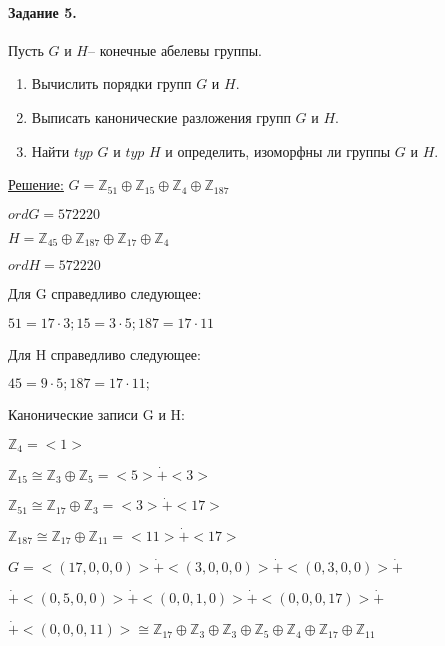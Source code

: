 \documentclass[utf8,14pt,a4paper,oneside,russian]{book}
\begin{document}
	\paragraph*{Задание 5.} Пусть $G$ и $H$– конечные абелевы группы.
	\begin{enumerate}[label=\asbuk{enumi})]
		\item Вычислить порядки групп $G$ и $H$.
		\item Выписать канонические разложения групп $G$ и $H$.
		\item Найти $typ$ $G$ и $typ$ $H$ и определить, изоморфны ли группы $G$ и $H$.
	\end{enumerate}
	\underline{Решение:} $G=\mathbb {Z}_{51}\oplus\mathbb {Z}_{15}\oplus\mathbb {Z}_{4}\oplus\mathbb {Z}_{187}$
	
	$ord G = 572220$
	
	$H=\mathbb {Z}_{45}\oplus\mathbb {Z}_{187}\oplus\mathbb {Z}_{17}\oplus\mathbb {Z}_{4}$
	
	$ord H = 572220$
	
	Для G справедливо следующее:
	
	$51=17\cdot3;15=3\cdot5;187=17\cdot11$
	
	Для H справедливо следующее:
	
	$45=9\cdot5;187=17\cdot11;$
	
	Канонические записи G и H:

	\vspace{\baselineskip}
	
	$\mathbb {Z}_{4}=<1>$
	
	$\mathbb {Z}_{15}\cong \mathbb {Z}_{3}\oplus\mathbb {Z}_{5}=<5>\dot{+}<3>$
	
	$\mathbb {Z}_{51}\cong\mathbb {Z}_{17}\oplus\mathbb {Z}_{3}=<3>\dot{+}<17>$
	
	$\mathbb {Z}_{187}\cong\mathbb {Z}_{17}\oplus\mathbb {Z}_{11}=<11>\dot{+}<17>$
	
	\vspace{\baselineskip}
	
	$G = <(17,0,0,0)>\dot{+}<(3,0,0,0)>\dot{+}<(0,3,0,0)>\dot{+}$ 
	
	$\dot{+}<(0,5,0,0)>\dot{+}<(0,0,1,0)>\dot{+}<(0,0,0,17)>\dot{+}$
	
	$\dot{+}<(0,0,0,11)> \cong \mathbb {Z}_{17}\oplus\mathbb {Z}_{3}\oplus\mathbb {Z}_{3}\oplus
	\mathbb {Z}_{5}\oplus\mathbb {Z}_{4}\oplus\mathbb {Z}_{17}\oplus\mathbb {Z}_{11}$  
	
	\vspace{\baselineskip}
	
\end{document}
